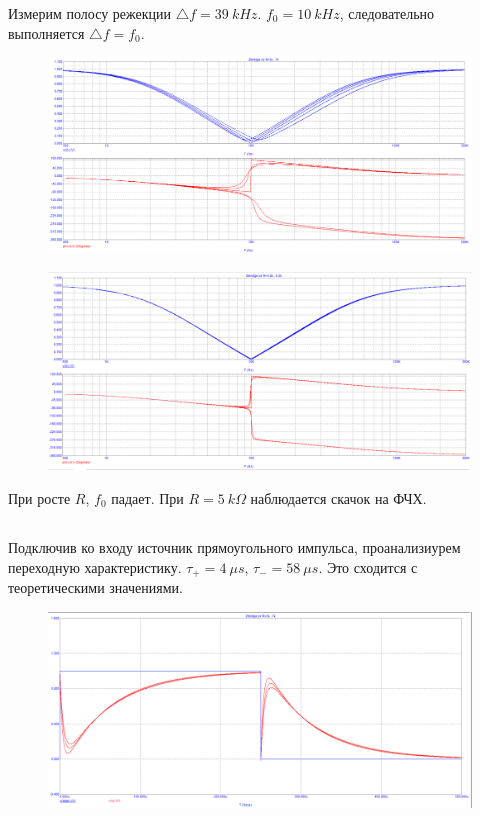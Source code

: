 \documentclass{article}
\begin{document}
Измерим полосу режекции $\triangle f = 39 \: kHz$. $f_0 = 10 \: kHz$, следовательно выполняется $\triangle f = f_0$.

\begin{figure}[H]
\centering
\includegraphics[scale=0.4]{2tbridge_AC2.png}
\label{fig:Image1}
\end{figure}

\begin{figure}[H]
\centering
\includegraphics[scale=0.4]{2tbridge_AC3.png}
\label{fig:Image1}
\end{figure}

При росте $R$, $f_0$ падает. При $R = 5 \: k\Omega$ наблюдается скачок на ФЧХ.

\subsection{}
Подключив ко входу источник прямоугольного импульса, проанализиурем переходную характеристику. $\tau_+ = 4 \: \mu s$, $\tau_- = 58 \: \mu s$. Это сходится с теоретическими значениями.

\begin{figure}[H]
\centering
\includegraphics[scale=0.4]{2tbridge_AC4.png}
\label{fig:Image1}
\end{figure}
\end{document}
